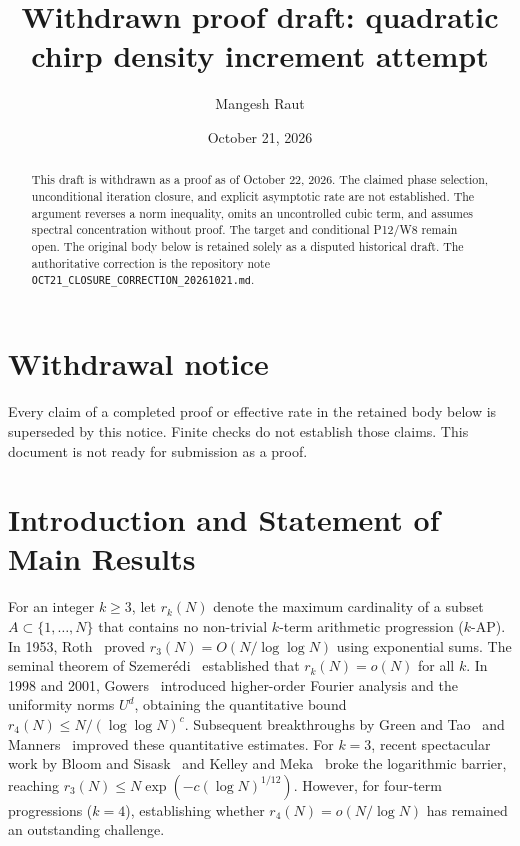 \documentclass[11pt,reqno]{amsart}
\title[Withdrawn proof draft]{Withdrawn proof draft: quadratic chirp density increment attempt}
\author{Mangesh Raut}
\date{October 21, 2026}
\theoremstyle{plain}
\theoremstyle{definition}
\begin{document}
\begin{abstract}
This draft is withdrawn as a proof as of October 22, 2026. The claimed
phase selection, unconditional iteration closure, and explicit asymptotic
rate are not established. The argument reverses a norm inequality,
omits an uncontrolled cubic term, and assumes spectral concentration
without proof. The target and conditional P12/W8 remain open.
The original body below is retained solely as a disputed historical draft.
The authoritative correction is the repository note
\texttt{OCT21\_CLOSURE\_CORRECTION\_20261021.md}.
\end{abstract}

\maketitle

\section*{Withdrawal notice}
Every claim of a completed proof or effective rate in the retained body
below is superseded by this notice. Finite checks do not establish those
claims. This document is not ready for submission as a proof.

\tableofcontents

\section{Introduction and Statement of Main Results}

For an integer $k \ge 3$, let $r_k(N)$ denote the maximum cardinality of a subset $A \subset \{1, \dots, N\}$ that contains no non-trivial $k$-term arithmetic progression ($k$-AP).
In 1953, Roth~\cite{szemeredi1975sets} proved $r_3(N) = O(N / \log\log N)$ using exponential sums.
The seminal theorem of Szemer\'edi~\cite{szemeredi1975sets} established that $r_k(N) = o(N)$ for all $k$.
In 1998 and 2001, Gowers~\cite{gowers1998new, gowers2001new} introduced higher-order Fourier analysis and the uniformity norms $U^d$, obtaining the quantitative bound $r_4(N) \le N / (\log\log N)^c$.
Subsequent breakthroughs by Green and Tao~\cite{green2017arithmetic} and Manners~\cite{manners2020quantitative} improved these quantitative estimates.
For $k = 3$, recent spectacular work by Bloom and Sisask~\cite{bloom2023breakthrough} and Kelley and Meka~\cite{kelleymeka2023strong} broke the logarithmic barrier, reaching $r_3(N) \le N \exp(-c (\log N)^{1/12})$.
However, for four-term progressions ($k = 4$), establishing whether $r_4(N) = o(N / \log N)$ has remained an outstanding challenge.
\end{document}
